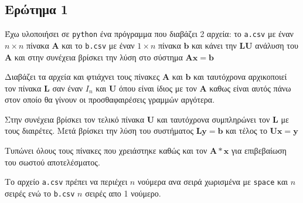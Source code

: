 \subsection{Ερώτημα 1}
Έχω υλοποιήσει σε \texttt{python} ένα πρόγραμμα που διαβάζει 2 αρχεία:
το \texttt{a.csv} με έναν $n\times n$ πίνακα $\mathbf{A}$ και το \texttt{b.csv} με έναν
$1\times n$ πίνακα $\mathbf{b}$ και κάνει την $\mathbf{LU}$ ανάλυση του $\mathbf{A}$
και στην συνέχεια βρίσκει την λύση στο σύστημα $\mathbf{Ax} = \mathbf{b}$

Διαβάζει τα αρχεία και φτιάχνει τους πίνακες $\mathbf{A}$ και $\mathbf{b}$
και ταυτόχρονα αρχικοποιεί τον πίνακα $\mathbf{L}$ σαν έναν $I_n$ και $\mathbf{U}$
όπου είναι ίδιος με τον $\mathbf{A}$ καθως είναι αυτός πάνω στον οποίο θα γίνουν
οι προσθαφαιρέσεις γραμμών αργότερα.

Στην συνέχεια βρίσκει τον τελικό πίνακα $\mathbf{U}$ και ταυτόχρονα συμπληρώνει
τον $\mathbf{L}$ με τους διαιρέτες. Μετά βρίσκει την λύση του συστήματος
$\mathbf{Ly} = \mathbf{b}$ και τέλος το $\mathbf{Ux} = \mathbf{y}$

Τυπώνει όλους τους πίνακες που χρειάστηκε καθώς και τον $\mathbf{A*x}$ για
επιβεβαίωση του σωστού αποτελέσματος.

Το αρχείο \texttt{a.csv} πρέπει να περιέχει $n$ νούμερα ανα σειρά χωρισμένα με
\texttt{space} και $n$ σειρές ενώ το \texttt{b.csv} $n$ σειρές απο 1 νούμερο.

